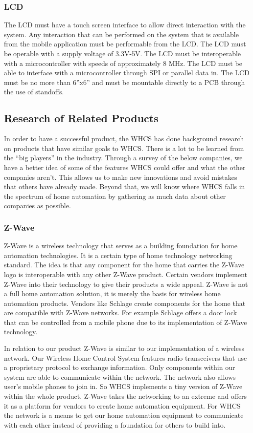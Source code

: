 \subsubsection{LCD}

The LCD must have a touch screen interface to allow direct interaction with the
system. Any interaction that can be performed on the system that is available
from the mobile application must be performable from the LCD. The LCD must be
operable with a supply voltage of 3.3V{}-5V. The LCD must be interoperable with
a microcontroller with speeds of approximately 8 MHz. The LCD must be able to
interface with a microcontroller through SPI or parallel data in. The LCD must
be no more than 6''x6'' and must be mountable directly to a PCB through the use
of standoffs.

\subsection{Research of Related Products}
In order to have a successful product, the WHCS has done background research on
products that have similar goals to WHCS. There is a lot to be learned from the
``big players'' in the industry. Through a survey of the below companies, we
have a better idea of some of the features WHCS could offer and what the other
companies aren't. This allows us to make new innovations and avoid mistakes
that others have already made. Beyond that, we will know where WHCS falls in
the spectrum of home automation by gathering as much data about other companies
as possible.

\subsubsection{Z-Wave}
Z{}-Wave is a wireless technology that serves as a building foundation for home
automation technologies. It is a certain type of home technology networking
standard. The idea is that any component for the home that carries the Z{}-Wave
logo is interoperable with any other Z{}-Wave product. Certain vendors
implement Z{}-Wave into their technology to give their products a wide appeal.
Z{}-Wave is not a full home automation solution, it is merely the basis for
wireless home automation products. Vendors like Schlage create components for
the home that are compatible with Z{}-Wave networks.  For example Schlage
offers a door lock that can be controlled from a mobile phone due to its
implementation of Z{}-Wave technology.

In relation to our product Z{}-Wave is similar to our
implementation of a wireless network. Our Wireless Home Control System 
features radio transceivers that use a proprietary protocol to exchange
information. Only components within our system are able to communicate
within the network. The network also allows user{}'s mobile phones to join
in. So WHCS implements a tiny version of Z{}-Wave within the whole product.
Z{}-Wave takes the networking to an extreme and offers it as a platform for
vendors to create home automation equipment. For WHCS the network is a means to
get our home automation equipment to communicate with each other instead of
providing a foundation for others to build into.

